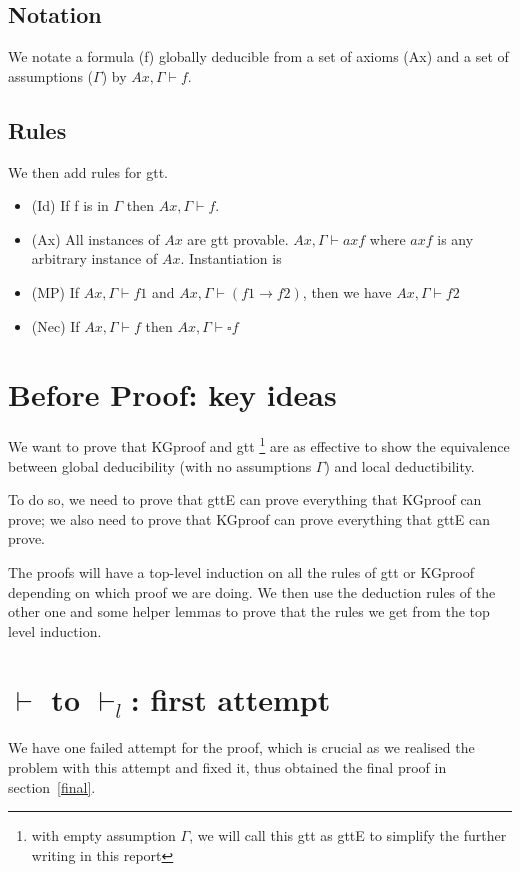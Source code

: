 \documentclass[submission,copyright,creativecommons]{eptcs}
\begin{document}
\subsection{Notation} 
We notate a formula (f) globally deducible from a set of axioms (Ax)
and a set of assumptions ($\Gamma$) by $Ax, \Gamma \vdash f$. 
\subsection{Rules}
We then add rules for gtt. 
\begin{itemize}
 \item (Id) If f is in $\Gamma$ then $Ax, \Gamma \vdash f$. 
 \item (Ax) All instances of $Ax$ are gtt provable. $Ax, \Gamma \vdash axf$ where $axf$ is 
 any arbitrary instance of $Ax$. Instantiation is 
 \item (MP) If $Ax, \Gamma \vdash f1$ and $Ax, \Gamma \vdash (f1 \rightarrow f2)$, then 
 we have $Ax, \Gamma \vdash f2$
 \item (Nec) If $Ax, \Gamma \vdash f$ then $Ax, \Gamma \vdash \square f$ 
\end{itemize}

\section{Before Proof: key ideas}
We want to prove that KGproof and gtt \footnote{with empty assumption $\Gamma$, 
we will call this gtt as gttE to simplify the further writing in this report}
 are as effective 
to show the equivalence between global deducibility (with no assumptions $\Gamma$) and local deductibility. 

To do so, we need to prove that gttE
can prove everything that KGproof can prove; 
we also need to prove that KGproof can prove everything that gttE can prove.

The proofs will have a top-level induction on all the rules of gtt or KGproof depending on which 
proof we are doing. We then use the deduction rules of the other one and some helper lemmas 
to prove that the rules we get from the top level induction.

\section{$\vdash$ to $\vdash_l$: first attempt}
We have one failed attempt for the proof, which is crucial as we 
realised the problem with this attempt and fixed it, thus obtained the final proof 
in section~\ref{final}.
\end{document}
